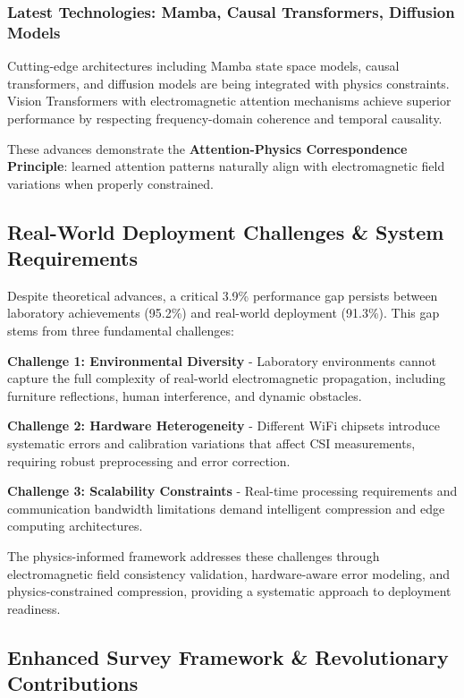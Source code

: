 \documentclass[journal]{IEEEtran}
\begin{document}
\subsubsection{Latest Technologies: Mamba, Causal Transformers, Diffusion Models}

Cutting-edge architectures including Mamba state space models, causal transformers, and diffusion models are being integrated with physics constraints. Vision Transformers with electromagnetic attention mechanisms \cite{luo2024vision} achieve superior performance by respecting frequency-domain coherence and temporal causality.

These advances demonstrate the \textbf{Attention-Physics Correspondence Principle}: learned attention patterns naturally align with electromagnetic field variations when properly constrained.

\subsection{Real-World Deployment Challenges \& System Requirements}

Despite theoretical advances, a critical 3.9\% performance gap persists between laboratory achievements (95.2\%) and real-world deployment (91.3\%). This gap stems from three fundamental challenges:

\textbf{Challenge 1: Environmental Diversity} - Laboratory environments cannot capture the full complexity of real-world electromagnetic propagation, including furniture reflections, human interference, and dynamic obstacles.

\textbf{Challenge 2: Hardware Heterogeneity} - Different WiFi chipsets introduce systematic errors and calibration variations that affect CSI measurements, requiring robust preprocessing and error correction.

\textbf{Challenge 3: Scalability Constraints} - Real-time processing requirements and communication bandwidth limitations demand intelligent compression and edge computing architectures.

The physics-informed framework addresses these challenges through electromagnetic field consistency validation, hardware-aware error modeling, and physics-constrained compression, providing a systematic approach to deployment readiness.

\subsection{Enhanced Survey Framework \& Revolutionary Contributions}
\end{document}
